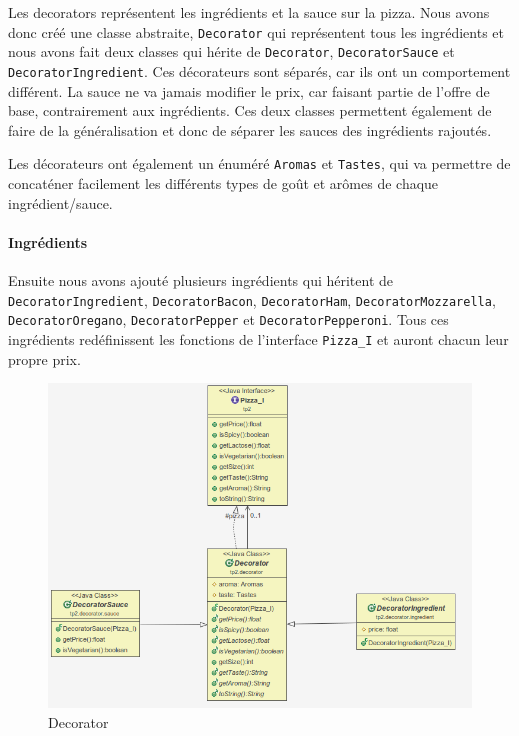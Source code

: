 \documentclass[french,]{article}
\let\oldparagraph\paragraph
\renewcommand{\paragraph}[1]{\oldparagraph{#1}\mbox{}}
\begin{document}
Les decorators représentent les ingrédients et la sauce sur la pizza.
Nous avons donc créé une classe abstraite, \texttt{Decorator} qui
représentent tous les ingrédients et nous avons fait deux classes qui
hérite de \texttt{Decorator}, \texttt{DecoratorSauce} et
\texttt{DecoratorIngredient}. Ces décorateurs sont séparés, car ils ont
un comportement différent. La sauce ne va jamais modifier le prix, car
faisant partie de l'offre de base, contrairement aux ingrédients. Ces
deux classes permettent également de faire de la généralisation et donc
de séparer les sauces des ingrédients rajoutés.

Les décorateurs ont également un énuméré \texttt{Aromas} et
\texttt{Tastes}, qui va permettre de concaténer facilement les
différents types de goût et arômes de chaque ingrédient/sauce.

\paragraph{Ingrédients}\label{ingruxe9dients}

Ensuite nous avons ajouté plusieurs ingrédients qui héritent de
\texttt{DecoratorIngredient}, \texttt{DecoratorBacon},
\texttt{DecoratorHam}, \texttt{DecoratorMozzarella},
\texttt{DecoratorOregano}, \texttt{DecoratorPepper} et
\texttt{DecoratorPepperoni}. Tous ces ingrédients redéfinissent les
fonctions de l'interface \texttt{Pizza\_I} et auront chacun leur propre
prix.

\begin{figure}[htbp]
\centering
\includegraphics{decoratorglobal.png}
\caption{Decorator}
\end{figure}
\end{document}
